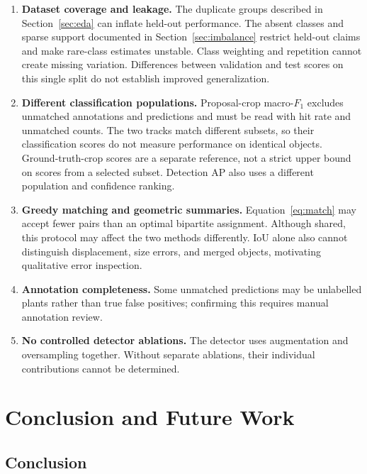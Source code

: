 \documentclass[a4paper,8pt]{article}
\begin{document}
\begin{enumerate}
\item \textbf{Dataset coverage and leakage.} The duplicate groups described in
Section~\ref{sec:eda} can inflate held-out performance. The absent classes and sparse support
documented in Section~\ref{sec:imbalance} restrict held-out claims and make rare-class estimates
unstable. Class weighting and repetition cannot create missing variation. Differences between
validation and test scores on this single split do not establish improved generalization.

\item \textbf{Different classification populations.} Proposal-crop macro-$F_1$ excludes unmatched
annotations and predictions and must be read with hit rate and unmatched counts. The two tracks
match different subsets, so their classification scores do not measure performance on identical
objects. Ground-truth-crop scores are a separate reference, not a strict upper bound on scores
from a selected subset. Detection AP also uses a different population and confidence ranking.

\item \textbf{Greedy matching and geometric summaries.} Equation~\eqref{eq:match} may accept
fewer pairs than an optimal bipartite assignment. Although shared, this protocol may affect the
two methods differently. IoU alone also cannot distinguish displacement, size errors, and merged
objects, motivating qualitative error inspection.

\item \textbf{Annotation completeness.} Some unmatched predictions may be unlabelled plants
rather than true false positives; confirming this requires manual annotation review.

\item \textbf{No controlled detector ablations.} The detector uses augmentation and oversampling
together. Without separate ablations, their individual contributions cannot be determined.
\end{enumerate}

\section{Conclusion and Future Work}
\label{sec:conclusion}

\subsection{Conclusion}
\end{document}
